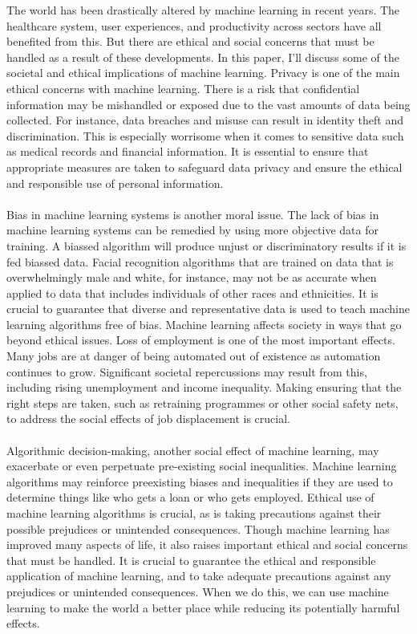 \documentclass{article}[12pt]
\theoremstyle{definition}
\begin{document}
The world has been drastically altered by machine learning in recent years. The healthcare system, user experiences, and productivity across sectors have all benefited from this. But there are ethical and social concerns that must be handled as a result of these developments. In this paper, I'll discuss some of the societal and ethical implications of machine learning. Privacy is one of the main ethical concerns with machine learning. There is a risk that confidential information may be mishandled or exposed due to the vast amounts of data being collected. For instance, data breaches and misuse can result in identity theft and discrimination. This is especially worrisome when it comes to sensitive data such as medical records and financial information. It is essential to ensure that appropriate measures are taken to safeguard data privacy and ensure the ethical and responsible use of personal information.
\\
\\
Bias in machine learning systems is another moral issue. The lack of bias in machine learning systems can be remedied by using more objective data for training. A biassed algorithm will produce unjust or discriminatory results if it is fed biassed data. Facial recognition algorithms that are trained on data that is overwhelmingly male and white, for instance, may not be as accurate when applied to data that includes individuals of other races and ethnicities. It is crucial to guarantee that diverse and representative data is used to teach machine learning algorithms free of bias. Machine learning affects society in ways that go beyond ethical issues. Loss of employment is one of the most important effects. Many jobs are at danger of being automated out of existence as automation continues to grow. Significant societal repercussions may result from this, including rising unemployment and income inequality. Making ensuring that the right steps are taken, such as retraining programmes or other social safety nets, to address the social effects of job displacement is crucial.
\\
\\
Algorithmic decision-making, another social effect of machine learning, may exacerbate or even perpetuate pre-existing social inequalities. Machine learning algorithms may reinforce preexisting biases and inequalities if they are used to determine things like who gets a loan or who gets employed. Ethical use of machine learning algorithms is crucial, as is taking precautions against their possible prejudices or unintended consequences. Though machine learning has improved many aspects of life, it also raises important ethical and social concerns that must be handled. It is crucial to guarantee the ethical and responsible application of machine learning, and to take adequate precautions against any prejudices or unintended consequences. When we do this, we can use machine learning to make the world a better place while reducing its potentially harmful effects.
\end{document}
